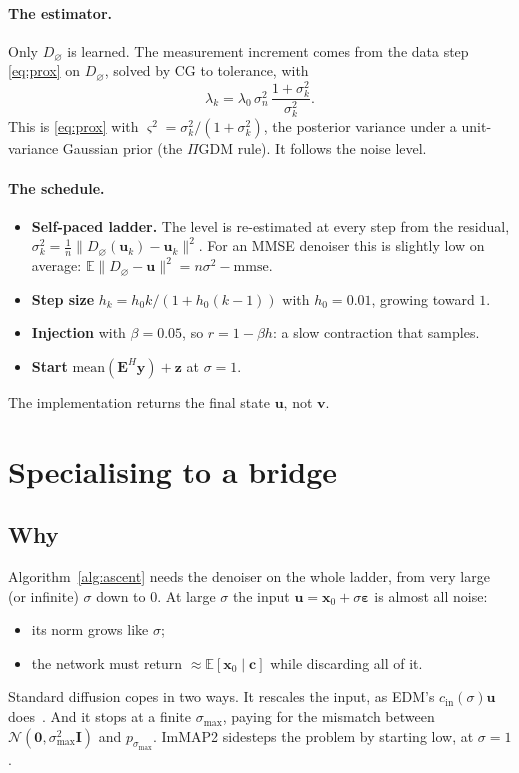 \documentclass[11pt]{article}
\theoremstyle{remark}
\newcommand{\x}{\bm{x}}
\newcommand{\y}{\bm{y}}
\newcommand{\uu}{\bm{u}}
\newcommand{\vv}{\bm{v}}
\newcommand{\eps}{\bm{\varepsilon}}
\newcommand{\zz}{\bm{z}}
\newcommand{\cc}{\bm{c}}
\newcommand{\E}{\mathbb{E}}
\newcommand{\N}{\mathcal{N}}
\newcommand{\Id}{\bm{I}}
\newcommand{\Op}{\bm{E}}
\newcommand{\Dz}{D_{\varnothing}}
\begin{document}
\paragraph{The estimator.} Only $\Dz$ is learned. The measurement increment comes from the data
step \eqref{eq:prox} on $\Dz$, solved by CG to tolerance, with
\[
  \lambda_k = \lambda_0\,\sigma_n^2\,\frac{1+\sigma_k^2}{\sigma_k^2} .
\]
This is \eqref{eq:prox} with $\varsigma^2 = \sigma_k^2/(1+\sigma_k^2)$, the posterior variance
under a unit-variance Gaussian prior (the $\Pi$GDM rule). It follows the noise level.

\paragraph{The schedule.}
\begin{itemize}[leftmargin=1.5em, itemsep=1pt]
  \item \textbf{Self-paced ladder.} The level is re-estimated at every step from the residual,
        $\sigma_k^2 = \tfrac1n\|\Dz(\uu_k)-\uu_k\|^2$. For an MMSE denoiser this is slightly
        low on average: $\E\|\Dz-\uu\|^2 = n\sigma^2 - \mathrm{mmse}$.
  \item \textbf{Step size} $h_k = h_0k/(1+h_0(k-1))$ with $h_0 = 0.01$, growing toward $1$.
  \item \textbf{Injection} with $\beta = 0.05$, so $r = 1-\beta h$: a slow contraction that samples.
  \item \textbf{Start} $\mathrm{mean}(\Op^H\y) + \zz$ at $\sigma = 1$.
\end{itemize}
The implementation returns the final state $\uu$, not $\vv$.

\section{Specialising to a bridge}\label{sec:bridge}

\subsection{Why}

Algorithm~\ref{alg:ascent} needs the denoiser on the whole ladder, from very large (or
infinite) $\sigma$ down to $0$. At large $\sigma$ the input $\uu=\x_0+\sigma\eps$ is almost all
noise:
\begin{itemize}[leftmargin=1.5em, itemsep=1pt]
  \item its norm grows like $\sigma$;
  \item the network must return $\approx\E[\x_0\mid\cc]$ while discarding all of it.
\end{itemize}
Standard diffusion copes in two ways. It rescales the input, as EDM's
$c_{\mathrm{in}}(\sigma)\uu$ does~\cite{karras2022}. And it stops at a finite $\sigma_{\max}$,
paying for the mismatch between $\N(\bm0,\sigma_{\max}^2\Id)$ and $p_{\sigma_{\max}}$. ImMAP2
sidesteps the problem by starting low, at $\sigma=1$.
\end{document}
